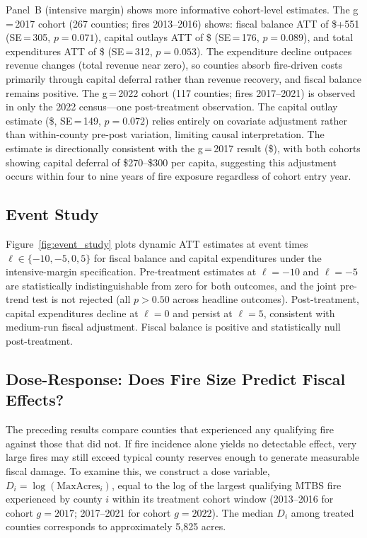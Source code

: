 \documentclass[12pt]{article}
\begin{document}
Panel~B (intensive margin) shows more informative cohort-level estimates.
The g\,=\,2017 cohort (267 counties; fires 2013--2016) shows: fiscal balance ATT of
\$+551 (SE\,=\,305, $p = 0.071$), capital outlays ATT of \$ (SE\,=\,176,
$p = 0.089$), and total expenditures ATT of \$ (SE\,=\,312, $p = 0.053$).
The expenditure decline outpaces revenue changes (total revenue near zero), so
counties absorb fire-driven costs primarily through capital deferral rather than
revenue recovery, and fiscal balance remains positive.
The g\,=\,2022 cohort (117 counties; fires 2017--2021) is observed in only the 2022
census---one post-treatment observation. The capital outlay estimate
(\$, SE\,=\,149, $p = 0.072$) relies entirely on covariate adjustment rather
than within-county pre-post variation, limiting causal interpretation. The estimate
is directionally consistent with the g\,=\,2017 result (\$), with both cohorts
showing capital deferral of \$270--\$300 per capita, suggesting this adjustment
occurs within four to nine years of fire exposure regardless of cohort entry year.

\subsection{Event Study}

Figure~\ref{fig:event_study} plots dynamic ATT estimates at event times
$\ell \in \{-10, -5, 0, 5\}$ for fiscal balance and capital expenditures under
the intensive-margin specification. Pre-treatment estimates at $\ell = -10$ and
$\ell = -5$ are statistically indistinguishable from zero for both outcomes, and
the joint pre-trend test is not rejected (all $p > 0.50$ across headline outcomes).
Post-treatment, capital expenditures decline at $\ell = 0$ and persist at $\ell = 5$,
consistent with medium-run fiscal adjustment. Fiscal balance is positive and statistically null post-treatment.

\subsection{Dose-Response: Does Fire Size Predict Fiscal Effects?}
\label{sec:dose_response}

The preceding results compare counties that experienced any qualifying fire against
those that did not. If fire incidence alone yields no detectable effect, very large
fires may still exceed typical county reserves enough to generate measurable fiscal
damage. To examine this, we construct a dose variable,
$D_i = \log(\text{MaxAcres}_i)$, equal to the log of the largest qualifying
MTBS fire experienced by county $i$ within its treatment cohort window
(2013--2016 for cohort $g = 2017$; 2017--2021 for cohort $g = 2022$).
The median $D_i$ among treated counties corresponds to approximately 5,825 acres.
\end{document}
